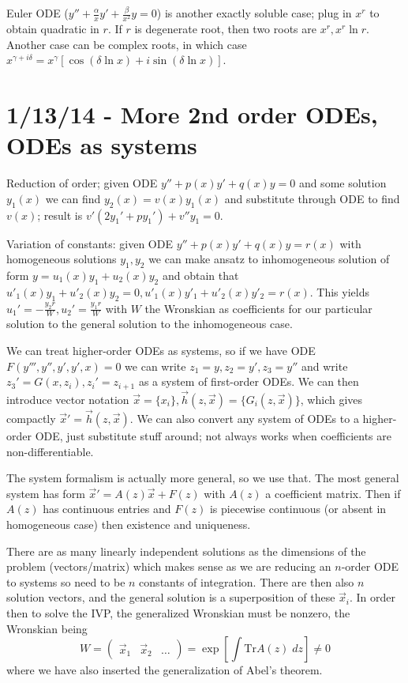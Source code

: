 \documentclass[10pt]{report}
\begin{document}
Euler ODE ($y'' + \frac{\alpha}{x}y' + \frac{\beta}{x^2}y = 0$) is another exactly soluble case; plug in $x^r$ to obtain quadratic in $r$. If $r$ is degenerate root, then two roots are $x^r, x^r\ln r$. Another case can be complex roots, in which case $x^{\gamma + i\delta} = x^\gamma\left[ \cos(\delta \ln x) + i\sin(\delta \ln x) \right]$.

\chapter{1/13/14 - More 2nd order ODEs, ODEs as systems}

Reduction of order; given ODE $y'' + p(x) y' + q(x) y = 0$ and some solution $y_1(x)$ we can find $y_2(x) = v(x)y_1(x)$ and substitute through ODE to find $v(x)$; result is $v'(2y_1' + py_1') + v''y_1 = 0$. 

Variation of constants: given ODE $y'' + p(x)y' + q(x) y = r(x)$ with homogeneous solutions $y_1, y_2$ we can make ansatz to inhomogeneous solution of form $y = u_1(x) y_1 + u_2(x) y_2$ and obtain that $u'_1(x) y_1 + u'_2(x)y_2 = 0, u'_1(x) y'_1 + u'_2(x)y'_2 = r(x)$. This yields $u_1' = -\frac{y_2r}{W}, u_2' = \frac{y_1r}{W}$ with $W$ the Wronskian as coefficients for our particular solution to the general solution to the inhomogeneous case. 

We can treat higher-order ODEs as systems, so if we have ODE $F(y''', y'', y', y', x) = 0$ we can write $z_1 = y, z_2 = y', z_3 = y''$ and write $z_3' = G(x, z_i), z_i' = z_{i+1}$ as a system of first-order ODEs. We can then introduce vector notation $\vec{x} = \{x_i\}, \vec{h}(z,\vec{x}) = \{G_i(z, \vec{x})\}$, which gives compactly $\vec{x}' = \vec{h}(z, \vec{x})$. We can also convert any system of ODEs to a higher-order ODE, just substitute stuff around; not always works when coefficients are non-differentiable.

The system formalism is actually more general, so we use that. The most general system has form $\vec{x}' = A(z)\vec{x} + F(z)$ with $A(z)$ a coefficient matrix. Then if $A(z)$ has continuous entries and $F(z)$ is piecewise continuous (or absent in homogeneous case) then existence and uniqueness.

There are as many linearly independent solutions as the dimensions of the problem (vectors/matrix) which makes sense as we are reducing an $n$-order ODE to systems so need to be $n$ constants of integration. There are then also $n$ solution vectors, and the general solution is a superposition of these $\vec{x}_i$. In order then to solve the IVP, the generalized Wronskian must be nonzero, the Wronskian being
$$W = \begin{pmatrix} \vec{x}_1 & \vec{x}_2&\dots \end{pmatrix} = \exp\left[ \int \mathrm{Tr}A(z)\; dz \right]\neq 0$$
where we have also inserted the generalization of Abel's theorem.
\end{document}
